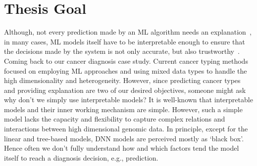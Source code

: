\section{Thesis Goal} \label{thesis_goal}
Although, not every prediction made by an ML algorithm needs an explanation~\cite{stiglic2020interpretability}, in many cases, ML models itself have to be interpretable enough to ensure that the decisions made by the system is not only accurate, but also trustworthy~\cite{mehrabi2019survey}. 
Coming back to our cancer diagnosis case study. Current cancer typing methods focused on employing ML approaches and using mixed data types to handle the high dimensionality and heterogeneity. However, since predicting cancer types and providing explanation are two of our desired objectives, someone might ask why don't we simply use interpretable models? 
It is well-known that interpretable models and their inner working mechanism are simple. However, such a simple model lacks the capacity and flexibility to capture complex relations and interactions between high dimensional genomic data. In principle, except for the linear and tree-based models, DNN models are perceived mostly as `black box'. Hence often we don't fully understand how and which factors tend the model itself to reach a diagnosis decision, e.g., prediction. %

